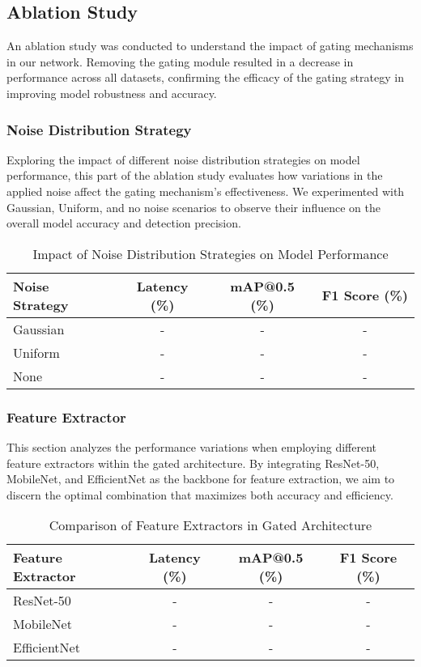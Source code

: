 \subsection{Ablation Study}

An ablation study was conducted to understand the impact of gating mechanisms in our network. Removing the gating module resulted in a decrease in performance across all datasets, confirming the efficacy of the gating strategy in improving model robustness and accuracy.

\subsubsection{Noise Distribution Strategy}

Exploring the impact of different noise distribution strategies on model performance, this part of the ablation study evaluates how variations in the applied noise affect the gating mechanism's effectiveness. We experimented with Gaussian, Uniform, and no noise scenarios to observe their influence on the overall model accuracy and detection precision.

\begin{table}[ht]
\centering
\caption{Impact of Noise Distribution Strategies on Model Performance}
\label{tab:noise_distribution}
\begin{tabular}{@{}lccc@{}}
\toprule
Noise Strategy & Latency (\%) & mAP@0.5 (\%) & F1 Score (\%) \\ 
\midrule
Gaussian & - & - & - \\
Uniform & - & - & - \\
None & - & - & - \\
\bottomrule
\end{tabular}
\end{table}

\subsubsection{Feature Extractor}

This section analyzes the performance variations when employing different feature extractors within the gated architecture. By integrating ResNet-50, MobileNet, and EfficientNet as the backbone for feature extraction, we aim to discern the optimal combination that maximizes both accuracy and efficiency.

\begin{table}[ht]
\centering
\caption{Comparison of Feature Extractors in Gated Architecture}
\label{tab:feature_extractor}
\begin{tabular}{@{}lccc@{}}
\toprule
Feature Extractor & Latency (\%) & mAP@0.5 (\%) & F1 Score (\%) \\ 
\midrule
ResNet-50 & - & - & - \\
MobileNet & - & - & - \\
EfficientNet & - & - & - \\
\bottomrule
\end{tabular}
\end{table}

